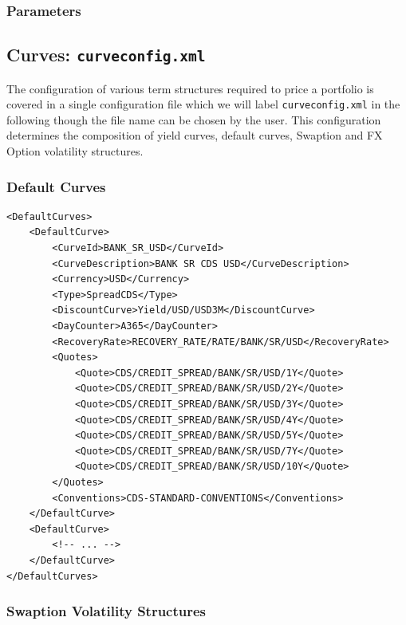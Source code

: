 \documentclass[12pt, a4paper]{article}
\begin{document}
\subsubsection{Parameters}\label{sec:sim_params}

\subsection{Curves: {\tt curveconfig.xml}}

The configuration of various term structures required to price a portfolio is covered in a single configuration file which we will label {\tt curveconfig.xml} in the following though the file name can be chosen by the user. This configuration determines the composition of yield curves, default curves, Swaption and FX Option volatility structures.
 


\subsubsection{Default Curves}

\begin{lstlisting}[caption={Default curve configuration}, 	label=lst:defaultcurve_configuration]
<DefaultCurves>
	<DefaultCurve>
		<CurveId>BANK_SR_USD</CurveId>
		<CurveDescription>BANK SR CDS USD</CurveDescription>
		<Currency>USD</Currency>
		<Type>SpreadCDS</Type>
		<DiscountCurve>Yield/USD/USD3M</DiscountCurve>
		<DayCounter>A365</DayCounter>
		<RecoveryRate>RECOVERY_RATE/RATE/BANK/SR/USD</RecoveryRate>
		<Quotes>
			<Quote>CDS/CREDIT_SPREAD/BANK/SR/USD/1Y</Quote>
			<Quote>CDS/CREDIT_SPREAD/BANK/SR/USD/2Y</Quote>
			<Quote>CDS/CREDIT_SPREAD/BANK/SR/USD/3Y</Quote>
			<Quote>CDS/CREDIT_SPREAD/BANK/SR/USD/4Y</Quote>
			<Quote>CDS/CREDIT_SPREAD/BANK/SR/USD/5Y</Quote>
			<Quote>CDS/CREDIT_SPREAD/BANK/SR/USD/7Y</Quote>
			<Quote>CDS/CREDIT_SPREAD/BANK/SR/USD/10Y</Quote>
		</Quotes>
		<Conventions>CDS-STANDARD-CONVENTIONS</Conventions>
	</DefaultCurve>
	<DefaultCurve>
		<!-- ... -->
	</DefaultCurve>
</DefaultCurves>

\end{lstlisting}

\subsubsection{Swaption Volatility Structures}
\end{document}
